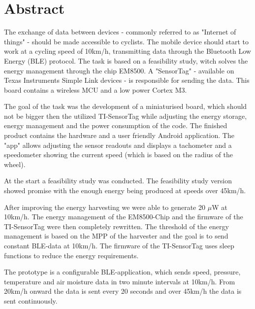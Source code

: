 \chapter{Abstract}

The exchange of data between devices - commonly referred to as
"Internet of things" - should be made accessible to cyclists. The
mobile device should start to work at a cycling speed of 10km/h,
transmitting data through the Bluetooth Low Energy (BLE) protocol. The
task is based on a feasibility study, witch solves the energy
management through the chip EM8500. A "SensorTag" - available on Texas
Instruments Simple Link devices - is responsible for sending the data.
This board contains a wireless MCU and a low power Cortex M3.

The goal of the task was the development of a miniaturised board, which
should not be bigger then the utilized TI-SensorTag while adjusting the
energy storage, energy management and the power consumption of the
code. The finished product contains the hardware and a user friendly
Android application. The "app" allows adjusting the sensor readouts and
displays a tachometer and a speedometer showing the current speed
(which is based on the radius of the wheel).

At the start a feasibility study was conducted. The feasibility study
version showed promise with the enough energy being produced at speeds
over 45km/h.

After improving the energy harvesting we were able to generate 20
$\mu$W at 10km/h. The energy management of the EM8500-Chip and the
firmware of the TI-SensorTag were then completely rewritten. The
threshold of the energy management is based on the MPP of the harvester
and the goal is to send constant BLE-data at 10km/h. The firmware of
the TI-SensorTag uses sleep functions to reduce the energy
requirements.

The prototype is a configurable BLE-application, which sends speed,
pressure, temperature and air moisture data in two minute intervals at
10km/h. From 20km/h onward the data is sent every 20 seconds and over
45km/h the data is sent continuously.
